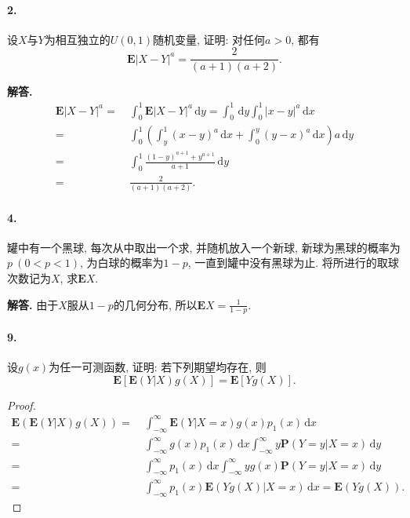 \documentclass[12pt, a4paper, oneside]{ctexart}
\newenvironment{solution}{\par\noindent\textbf{解答. }}{\bigskip\par}
\def\d{\mathrm{d}}      %
\def\P{\textbf{P}}      %
\def\E{\textbf{E}}      %
\def\add{\vspace{0.5ex}}  %
\def\del{\vspace{-3.5ex}}  %
\begin{document}
\paragraph{2.}设$X$与$Y$为相互独立的$U(0,1)$随机变量, 证明: 对任何$a>0$, 都有
\begin{equation*}
    \E|X-Y|^a = \frac{2}{(a+1)(a+2)}.
\end{equation*}
\begin{solution}\del
    \begin{align*}
        \E|X-Y|^a =&\ \int_0^1 \E|X-Y|^a\,\d y = \int_0^1\,\d y\int_0^1|x-y|^a\,\d x\\
        =&\ \int_0^1\left(\int_y^1(x-y)^a\,\d x+\int_0^y(y-x)^a\,\d x\right)a\,\d y\\
        =&\ \int_0^1\frac{(1-y)^{a+1}+y^{a+1}}{a+1}\,\d y\\
        =&\ \frac{2}{(a+1)(a+2)}.
    \end{align*}
\end{solution}\del\del
\paragraph{4.}罐中有一个黑球, 每次从中取出一个求, 并随机放入一个新球, 新球为黑球的概率为$p\ (0<p<1)$, 为白球的概率为$1-p$, 一直到罐中没有黑球为止. 将所进行的取球次数记为$X$, 求$\E X$.\add
\begin{solution}
    由于$X$服从$1-p$的几何分布, 所以$\E X = \frac{1}{1-p}$.
\end{solution}
\paragraph{9.}设$g(x)$为任一可测函数, 证明: 若下列期望均存在, 则
\begin{equation*}
    \E[\E(Y|X)g(X)] = \E[Yg(X)].
\end{equation*}
\begin{proof}\ \del
    \begin{align*}
        \E(\E(Y|X)g(X)) =&\ \int_{-\infty}^\infty\E(Y|X = x)g(x)p_1(x)\,\d x\\
        =&\ \int_{-\infty}^\infty g(x)p_1(x)\,\d x\int_{-\infty}^\infty y\P(Y=y|X=x)\,\d y\\
        =&\ \int_{-\infty}^\infty p_1(x)\,\d x\int_{-\infty}^\infty yg(x)\P(Y=y|X=x)\,\d y\\
        =&\ \int_{-\infty}^\infty p_1(x)\E(Yg(X)|X= x)\,\d x = \E(Yg(X)).
    \end{align*}
\end{proof}\del
\end{document}
